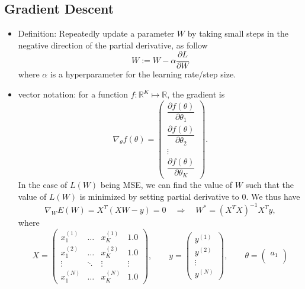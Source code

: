 \documentclass[twocolumn,landscape,10pt]{article}
\theoremstyle{definition}
\begin{document}
\subsection{Gradient Descent}

\begin{itemize}
    \item Definition: Repeatedly update a parameter $W$ by taking small
        steps in the negative direction of the partial derivative, as follow
        \[
            W := W - \alpha \frac{\partial L}{\partial W}
        \]
        where $\alpha$ is a hyperparameter for the learning rate/step size.
    \item vector notation: for a function $f:\mathbb{R}^{K}\mapsto\mathbb{R}$,
        the gradient is
        \[
            \nabla_\theta f(\theta) = \begin{pmatrix}
                \dfrac{\partial f(\theta)}{\partial \theta_1} \\[2ex]
                \dfrac{\partial f(\theta)}{\partial \theta_2} \\
                \vdots \\
                \dfrac{\partial f(\theta)}{\partial \theta_K}
            \end{pmatrix}.
        \]
        In the case of $L(W)$ being MSE, we can find the value of $W$ such that
        the value of $L(W)$ is minimized by setting partial derivative to 0.
        We thus have
        \[
            \nabla_W E(W) = X^T(XW - y)=0
            \quad\Longrightarrow\quad W^* = {\left(X^TX\right)}^{-1}X^Ty,
        \]
        where
        \[
            X = \begin{pmatrix}
                x_1^{(1)} & \ldots & x_{K}^{(1)} & 1.0 \\[1ex]
                x_1^{(2)} & \ldots & x_{K}^{(2)} & 1.0 \\
                \vdots & \ddots & \vdots & \vdots \\
                x_1^{(N)} & \ldots & x_{K}^{(N)} & 1.0
            \end{pmatrix},\qquad
            y = \begin{pmatrix}
                y^{(1)} \\
                y^{(2)} \\
                \vdots \\
                y^{(N)}
            \end{pmatrix},\qquad
            \theta = \begin{pmatrix}
                    a_1 \\

\end{pmatrix}\]
\end{itemize}
\end{document}
